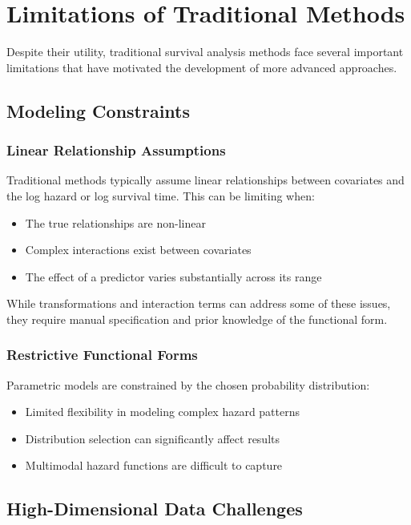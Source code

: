 \section{Limitations of Traditional Methods}

Despite their utility, traditional survival analysis methods face several important limitations that have motivated the development of more advanced approaches.

\subsection{Modeling Constraints}

\subsubsection{Linear Relationship Assumptions}

Traditional methods typically assume linear relationships between covariates and the log hazard or log survival time. This can be limiting when:

\begin{itemize}
    \item The true relationships are non-linear
    \item Complex interactions exist between covariates
    \item The effect of a predictor varies substantially across its range
\end{itemize}

While transformations and interaction terms can address some of these issues, they require manual specification and prior knowledge of the functional form.

\subsubsection{Restrictive Functional Forms}

Parametric models are constrained by the chosen probability distribution:

\begin{itemize}
    \item Limited flexibility in modeling complex hazard patterns
    \item Distribution selection can significantly affect results
    \item Multimodal hazard functions are difficult to capture
\end{itemize}

\subsection{High-Dimensional Data Challenges}


